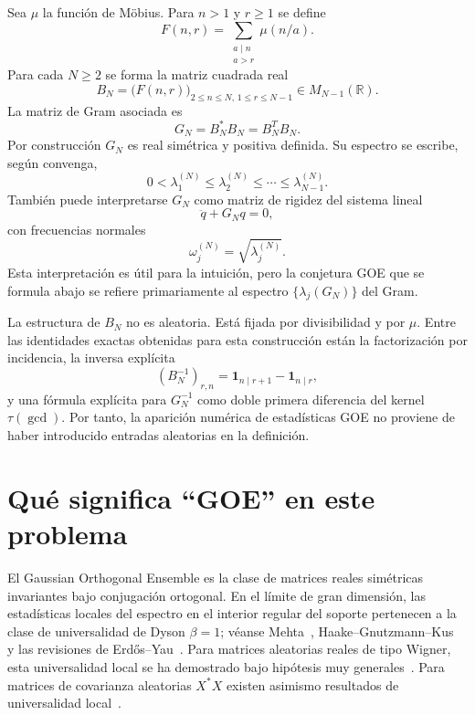 \documentclass[11pt,a4paper]{article}
\begin{document}
Sea $\mu$ la función de Möbius. Para $n>1$ y $r\ge1$ se define
\begin{equation}
F(n,r)=\sum_{\substack{a\mid n\\a>r}}\mu(n/a).
\label{eq:Fdef}
\end{equation}
Para cada $N\ge2$ se forma la matriz cuadrada real
\begin{equation}
B_N=\bigl(F(n,r)\bigr)_{2\le n\le N,\,1\le r\le N-1}
\in M_{N-1}(\mathbb R).
\label{eq:BNdef}
\end{equation}
La matriz de Gram asociada es
\begin{equation}
G_N=B_N^*B_N=B_N^TB_N.
\label{eq:GNdef}
\end{equation}
Por construcción $G_N$ es real simétrica y positiva definida. Su espectro se escribe, según convenga,
\begin{equation}
0<\lambda_1^{(N)}\le\lambda_2^{(N)}\le\cdots\le\lambda_{N-1}^{(N)}.
\label{eq:eigs-ascending}
\end{equation}
También puede interpretarse $G_N$ como matriz de rigidez del sistema lineal
\begin{equation}
\ddot q+G_Nq=0,
\end{equation}
con frecuencias normales
\begin{equation}
\omega_j^{(N)}=\sqrt{\lambda_j^{(N)}}.
\end{equation}
Esta interpretación es útil para la intuición, pero la conjetura GOE que se formula abajo se refiere primariamente al espectro $\{\lambda_j(G_N)\}$ del Gram.

La estructura de $B_N$ no es aleatoria. Está fijada por divisibilidad y por $\mu$. Entre las identidades exactas obtenidas para esta construcción están la factorización por incidencia, la inversa explícita
\begin{equation}
(B_N^{-1})_{r,n}=\mathbf 1_{n\mid r+1}-\mathbf 1_{n\mid r},
\end{equation}
y una fórmula explícita para $G_N^{-1}$ como doble primera diferencia del kernel $\tau(\gcd)$. Por tanto, la aparición numérica de estadísticas GOE no proviene de haber introducido entradas aleatorias en la definición.

\section{Qué significa ``GOE'' en este problema}

El Gaussian Orthogonal Ensemble es la clase de matrices reales simétricas invariantes bajo conjugación ortogonal. En el límite de gran dimensión, las estadísticas locales del espectro en el interior regular del soporte pertenecen a la clase de universalidad de Dyson $\beta=1$; véanse Mehta~\cite{Mehta2004}, Haake--Gnutzmann--Kus~\cite{Haake2018} y las revisiones de Erdős--Yau~\cite{ErdosYau2012}. Para matrices aleatorias reales de tipo Wigner, esta universalidad local se ha demostrado bajo hipótesis muy generales~\cite{ErdosYauYin2012,TaoVu2011}. Para matrices de covarianza aleatorias $X^*X$ existen asimismo resultados de universalidad local~\cite{BenArousPeche2005,TaoVuCov2012}.
\end{document}
